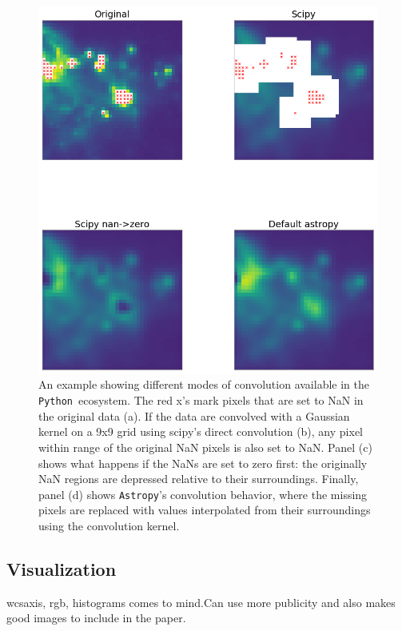 \documentclass[modern]{aastex61}
\newcommand{\package}[1]{\texttt{#1}}
\newcommand{\python}{\package{Python}}
\newcommand{\astropypkg}{\package{Astropy}}
\begin{document}
\begin{figure}
\includegraphics[width=\textwidth]{convolution_example.png}
An example showing different modes of convolution available in the \python\ ecosystem.  The red x's mark pixels that are set to NaN in the original data (a).  If the data are convolved with a Gaussian kernel on a 9x9 grid using scipy's direct convolution (b), any pixel within range of the original NaN pixels is also set to NaN.  Panel (c) shows what happens if the NaNs are set to zero first: the originally NaN regions are depressed relative to their surroundings.  Finally, panel (d) shows \astropypkg's convolution behavior, where the missing pixels are replaced with values interpolated from their surroundings using the convolution kernel.
\end{figure}


\subsection{Visualization}

wcsaxis, rgb, histograms comes to mind.Can use more publicity and also makes good images to include in the paper.
\end{document}
